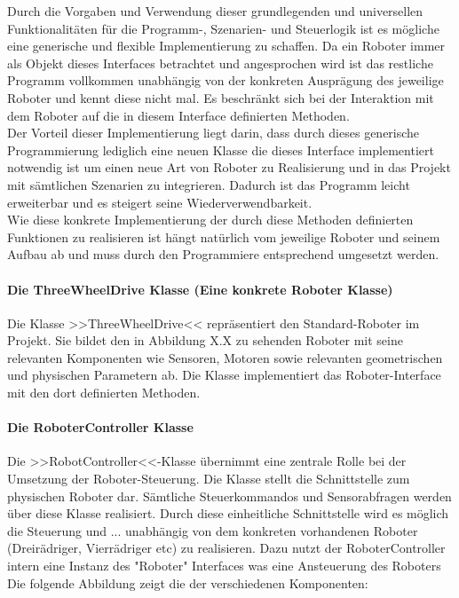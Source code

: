 Durch die Vorgaben und Verwendung dieser grundlegenden und universellen Funktionalitäten für die Programm-, Szenarien- und Steuerlogik 
ist es mögliche eine generische und flexible Implementierung zu schaffen. Da ein Roboter immer als Objekt dieses Interfaces betrachtet 
und angesprochen wird ist das restliche Programm vollkommen unabhängig von der konkreten Ausprägung des jeweilige Roboter und kennt 
diese nicht mal. Es beschränkt sich bei der Interaktion mit dem Roboter auf die in diesem Interface definierten Methoden. \\
Der Vorteil dieser Implementierung liegt darin, dass durch dieses generische Programmierung lediglich eine neuen Klasse die dieses 
Interface implementiert notwendig ist um einen neue Art von Roboter zu Realisierung und in das Projekt mit sämtlichen Szenarien zu 
integrieren. Dadurch ist das Programm leicht erweiterbar und es steigert seine Wiederverwendbarkeit. \\
Wie diese konkrete Implementierung der durch diese Methoden definierten Funktionen zu realisieren ist hängt natürlich vom jeweilige
Roboter und seinem Aufbau ab und muss durch den Programmiere entsprechend umgesetzt werden.
\paragraph{Die ThreeWheelDrive Klasse (Eine konkrete Roboter Klasse)}
\color{process}             %
Die Klasse >>ThreeWheelDrive<< repräsentiert den \glqq{}Standard\grqq{}-Roboter im Projekt. Sie bildet den in Abbildung X.X zu 
sehenden Roboter mit seine relevanten Komponenten wie Sensoren, Motoren sowie relevanten geometrischen und physischen Parametern ab.
Die Klasse implementiert das Roboter-Interface mit den dort definierten Methoden. 
\paragraph{Die RoboterController Klasse}
Die >>RobotController<<-Klasse übernimmt eine zentrale Rolle bei der Umsetzung der Roboter-Steuerung. Die Klasse stellt die Schnittstelle
zum physischen Roboter dar. Sämtliche Steuerkommandos und Sensorabfragen werden über diese Klasse realisiert. Durch diese einheitliche 
Schnittstelle wird es möglich die Steuerung und ... unabhängig von dem konkreten vorhandenen Roboter (Dreirädriger, Vierrädriger etc)
zu realisieren. Dazu nutzt der RoboterController intern eine Instanz des "Roboter" Interfaces was eine Ansteuerung des Roboters 
\\
Die folgende Abbildung zeigt die der verschiedenen Komponenten:
